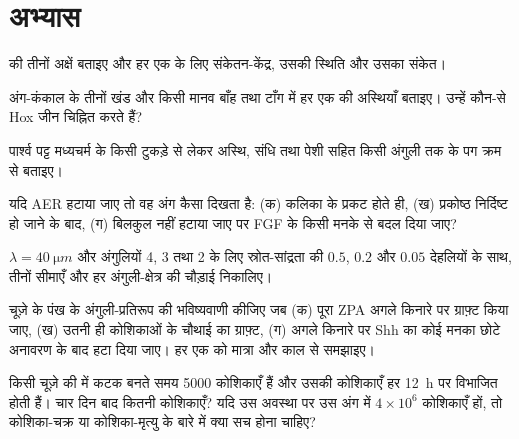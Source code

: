\section{अभ्यास}

\begin{exercise}[$\star$]\label{exo:b2:limb-organogenesis:1}
 की तीनों अक्षें बताइए और हर एक के लिए संकेतन-केंद्र,
उसकी स्थिति और उसका संकेत।
\end{exercise}

\begin{exercise}[$\star$]\label{exo:b2:limb-organogenesis:2}
अंग-कंकाल के तीनों खंड और किसी मानव बाँह तथा टाँग में हर एक की
अस्थियाँ बताइए। उन्हें कौन-से Hox जीन चिह्नित करते हैं?
\end{exercise}

\begin{exercise}[$\star$]\label{exo:b2:limb-organogenesis:3}
पार्श्व पट्ट मध्यचर्म के किसी टुकड़े से लेकर अस्थि, संधि तथा पेशी सहित
किसी अंगुली तक के पग क्रम से बताइए।
\end{exercise}

\begin{exercise}[$\star$]\label{exo:b2:limb-organogenesis:4}
यदि AER हटाया जाए तो वह अंग कैसा दिखता है: (क) कलिका के प्रकट होते ही,
(ख) प्रकोष्ठ निर्दिष्ट हो जाने के बाद, (ग) बिलकुल नहीं हटाया जाए पर
FGF के किसी मनके से बदल दिया जाए?
\end{exercise}

\begin{exercise}[$\star\star$]\label{exo:b2:limb-organogenesis:5}
$\lambda = \qty{40}{\micro m}$ और अंगुलियों 4, 3 तथा 2 के लिए
स्रोत-सांद्रता की $0.5$, $0.2$ और $0.05$ देहलियों के साथ,
तीनों सीमाएँ और हर अंगुली-क्षेत्र की चौड़ाई निकालिए।
\end{exercise}

\begin{exercise}[$\star\star$]\label{exo:b2:limb-organogenesis:6}
चूज़े के पंख के अंगुली-प्रतिरूप की भविष्यवाणी कीजिए जब (क) पूरा ZPA
अगले किनारे पर ग्राफ़्ट किया जाए, (ख) उतनी ही कोशिकाओं के चौथाई का
ग्राफ़्ट, (ग) अगले किनारे पर Shh का कोई मनका छोटे अनावरण के बाद हटा
दिया जाए। हर एक को मात्रा और काल से समझाइए।
\end{exercise}

\begin{exercise}[$\star\star$]\label{exo:b2:limb-organogenesis:7}
किसी चूज़े की  में कटक बनते समय \num{5000} कोशिकाएँ हैं और उसकी
कोशिकाएँ हर \qty{12}{h} पर विभाजित होती हैं। चार दिन बाद कितनी कोशिकाएँ?
यदि उस अवस्था पर उस अंग में $4\times 10^{6}$ कोशिकाएँ हों, तो
कोशिका-चक्र या कोशिका-मृत्यु के बारे में क्या सच होना चाहिए?
\end{exercise}

